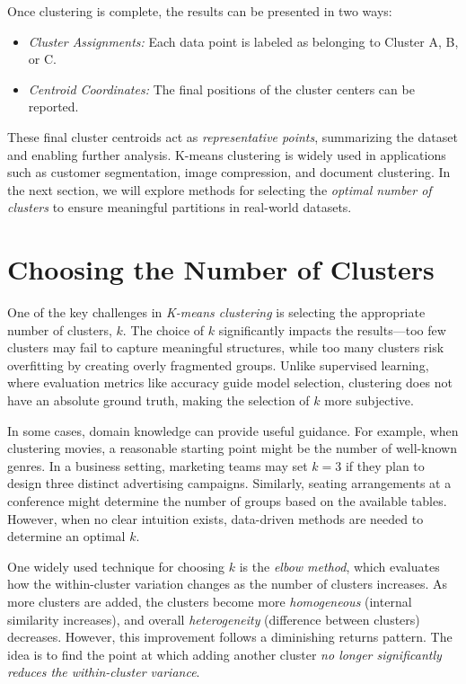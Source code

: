 \documentclass[
]{book}
\providecommand{\tightlist}{%
  \setlength{\itemsep}{0pt}\setlength{\parskip}{0pt}}
\theoremstyle{definition}
\theoremstyle{definition}
\theoremstyle{definition}
\theoremstyle{definition}
\theoremstyle{remark}
\begin{document}
Once clustering is complete, the results can be presented in two ways:

\begin{itemize}
\tightlist
\item
  \emph{Cluster Assignments:} Each data point is labeled as belonging to Cluster A, B, or C.\\
\item
  \emph{Centroid Coordinates:} The final positions of the cluster centers can be reported.
\end{itemize}

These final cluster centroids act as \emph{representative points}, summarizing the dataset and enabling further analysis. K-means clustering is widely used in applications such as customer segmentation, image compression, and document clustering. In the next section, we will explore methods for selecting the \emph{optimal number of clusters} to ensure meaningful partitions in real-world datasets.

\section{Choosing the Number of Clusters}\label{kmeans-choose}

One of the key challenges in \emph{K-means clustering} is selecting the appropriate number of clusters, \emph{\(k\)}. The choice of \(k\) significantly impacts the results---too few clusters may fail to capture meaningful structures, while too many clusters risk overfitting by creating overly fragmented groups. Unlike supervised learning, where evaluation metrics like accuracy guide model selection, clustering does not have an absolute ground truth, making the selection of \(k\) more subjective.

In some cases, domain knowledge can provide useful guidance. For example, when clustering movies, a reasonable starting point might be the number of well-known genres. In a business setting, marketing teams may set \(k = 3\) if they plan to design three distinct advertising campaigns. Similarly, seating arrangements at a conference might determine the number of groups based on the available tables. However, when no clear intuition exists, data-driven methods are needed to determine an optimal \(k\).

One widely used technique for choosing \(k\) is the \emph{elbow method}, which evaluates how the within-cluster variation changes as the number of clusters increases. As more clusters are added, the clusters become more \emph{homogeneous} (internal similarity increases), and overall \emph{heterogeneity} (difference between clusters) decreases. However, this improvement follows a diminishing returns pattern. The idea is to find the point at which adding another cluster \emph{no longer significantly reduces the within-cluster variance}.
\end{document}
